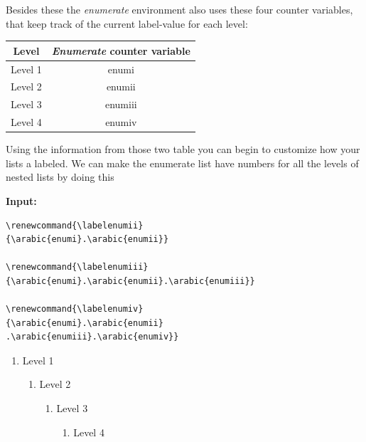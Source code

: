 Besides these the \textit{enumerate} environment also uses these four 
counter variables, that keep track of the current label-value for each level:

\begin{table}[H]
    \centering
    \begin{tabular}{|c|c|}\hline
        \rowcolor{gray!30}
        Level & \textit{Enumerate} counter variable \\ \hline
        Level 1 & enumi \\ \hline
        Level 2 & enumii \\ \hline
        Level 3 & enumiii \\ \hline
        Level 4 & enumiv \\ \hline
    \end{tabular}
\end{table}


Using the information from those two table you can begin to customize how your lists a labeled. We can make the enumerate list have numbers for all the levels of nested lists
by doing this

\begin{multicols}{2}
    \begin{minipage}{\linewidth}
        \textbf{Input:} \\
        \begin{verbatim}
\renewcommand{\labelenumii}
{\arabic{enumi}.\arabic{enumii}} 

\renewcommand{\labelenumiii}
{\arabic{enumi}.\arabic{enumii}.\arabic{enumiii}}

\renewcommand{\labelenumiv}
{\arabic{enumi}.\arabic{enumii}
.\arabic{enumiii}.\arabic{enumiv}}
        \end{verbatim}
    \end{minipage}
    \renewcommand{\labelenumii}{\arabic{enumi}.\arabic{enumii}} 
    \renewcommand{\labelenumiii}{\arabic{enumi}.\arabic{enumii}.\arabic{enumiii}}
    \renewcommand{\labelenumiv}{\arabic{enumi}.\arabic{enumii}.\arabic{enumiii}.\arabic{enumiv}}

    \begin{enumerate}
        \item Level 1
        \begin{enumerate}
            \item Level 2
            \begin{enumerate}
                \item Level 3
                \begin{enumerate}
                    \item Level 4
                \end{enumerate}
            \end{enumerate}
        \end{enumerate}
    \end{enumerate}
    \begin{minipage}{\linewidth}
        
    \end{minipage}
\end{multicols}


